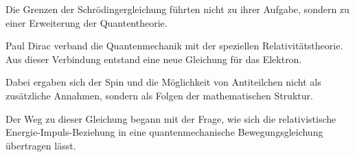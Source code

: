 \begin{HistoryBox}
	\label{box:naechster_schritt_dirac}
	
	Die Grenzen der Schrödingergleichung führten nicht zu ihrer Aufgabe,
	sondern zu einer Erweiterung der Quantentheorie.
	
	Paul Dirac verband die Quantenmechanik mit der speziellen
	Relativitätstheorie. Aus dieser Verbindung entstand eine neue Gleichung
	für das Elektron.
	
	Dabei ergaben sich der Spin und die Möglichkeit von Antiteilchen nicht
	als zusätzliche Annahmen, sondern als Folgen der mathematischen
	Struktur.
\end{HistoryBox}

Der Weg zu dieser Gleichung begann mit der Frage, wie sich die
relativistische Energie-Impuls-Beziehung in eine quantenmechanische
Bewegungsgleichung übertragen lässt.

